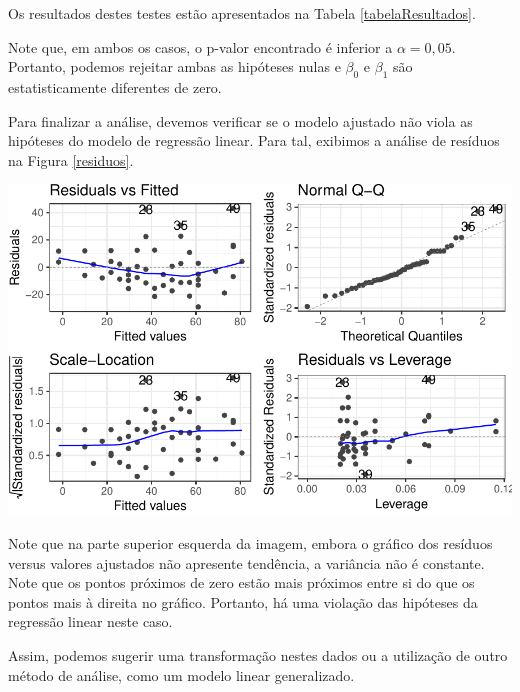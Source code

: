 \documentclass[12pt,twoside,printwatermark=false]{pinp}
\begin{document}
\noindent Os resultados destes testes estão apresentados na Tabela
\ref{tabelaResultados}.

Note que, em ambos os casos, o p-valor encontrado é inferior a
\(\alpha = 0,05\). Portanto, podemos rejeitar ambas as hipóteses nulas e
\(\beta_0\) e \(\beta_1\) são estatisticamente diferentes de zero.

Para finalizar a análise, devemos verificar se o modelo ajustado não
viola as hipóteses do modelo de regressão linear. Para tal, exibimos a
análise de resíduos na Figura \ref{residuos}.

\begin{Shaded}
\begin{Highlighting}[]
\end{Highlighting}
\end{Shaded}

\begin{center}\includegraphics{Untitled_files/figure-latex/residuos-1} \end{center}

Note que na parte superior esquerda da imagem, embora o gráfico dos
resíduos versus valores ajustados não apresente tendência, a variância
não é constante. Note que os pontos próximos de zero estão mais próximos
entre si do que os pontos mais à direita no gráfico. Portanto, há uma
violação das hipóteses da regressão linear neste caso.

Assim, podemos sugerir uma transformação nestes dados ou a utilização de
outro método de análise, como um modelo linear generalizado.





\end{document}
